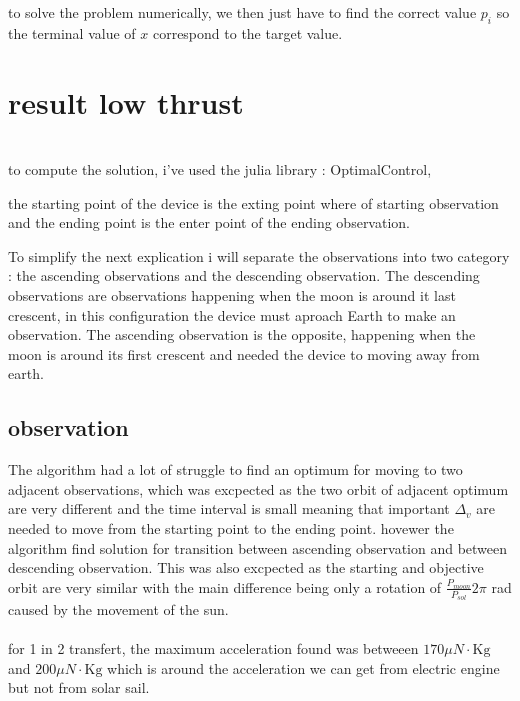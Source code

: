 \documentclass{article} %
\begin{document}
			to solve the problem numerically, we then just have to find the correct value $p_i$ so the terminal value of $x$ correspond to the target value.
			
			\section{result low thrust}
				\\
			to compute the solution, i've used the julia library : OptimalControl,
			
			the starting point of the device is the exting point where of starting observation and the ending point is the enter point of the ending observation.
			
			To simplify the next explication i will separate the observations into two category : the ascending observations and the descending observation. The descending observations are observations happening when the moon is around it last crescent, in this configuration the device must aproach Earth to make an observation. The ascending observation is the opposite, happening when the moon is around its first crescent and needed the device to moving away from earth.
			
			\subsection{observation}
			The algorithm had a lot of struggle to find an optimum for moving to two adjacent observations, which was excpected as the two orbit of adjacent optimum are very different and the time interval is small meaning that important $\Delta_v$ are needed to move from the starting point to the ending point. hovewer the algorithm find solution for transition between ascending observation and between descending observation. This was also excpected as the starting and objective orbit are very similar with the main difference being only a rotation of $\frac{P_{moon}}{P_{sol}}2\pi $ rad caused by the movement of the sun.
			\\ \\
			for 1 in 2 transfert, the maximum acceleration found was betweeen $170 \mu{N}\cdot\text{Kg}$ and $200 \mu{N}\cdot\text{Kg}$ which is around the acceleration we can get from electric engine but not from solar sail.
		
\end{document}
